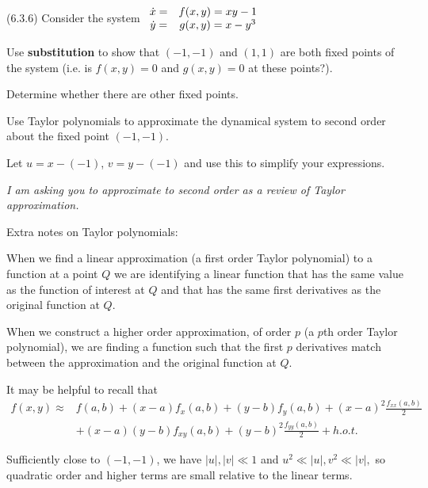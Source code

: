 \documentclass[12pt,letterpaper,noanswers]{exam}
\begin{document}
\begin{questions}
\setcounter{question}{1}
\item (6.3.6) Consider the system
$\displaystyle\begin{array}{c c c}
 \dot{x} = & f(x,y) = x y - 1 \\
 \dot{y} = & g(x,y) = x - y^3
\end{array}$
 \begin{parts}
 \item Use \textbf{substitution} to show that $(-1,-1)$ and $(1,1)$ are both fixed points of the system (i.e. is $f(x,y) = 0$ and $g(x,y) = 0$ at these points?).  
 
 Determine whether there are other fixed points.
 \item Use Taylor polynomials to approximate the dynamical system to second order about the fixed point $(-1, -1)$.  
 
 Let $u = x-(-1)$, $v = y - (-1)$ and use this to simplify your expressions.
 
 \emph{I am asking you to approximate to second order as a review of Taylor approximation.}
 
 \begin{tcolorbox}
 
 Extra notes on Taylor polynomials:
 
 When we find a linear approximation (a first order Taylor polynomial) to a function at a point $Q$ we are identifying a linear function that has the same value as the function of interest at $Q$ and that has the same first derivatives as the original function at $Q$.
 
 When we construct a higher order approximation, of order $p$  (a $p$th order Taylor polynomial), we are finding a function such that the first $p$ derivatives match between the approximation and the original function at $Q$.
 
It may be helpful to recall that
 \begin{align*} 
 f(x,y) \approx& f(a,b) + (x-a)f_x(a,b) + (y-b) f_y(a,b) + (x-a)^2\frac{f_{xx}(a,b)}{2}\\
 &+(x-a)(y-b)f_{xy}(a,b) + (y-b)^2\frac{f_{yy}(a,b)}{2} + h.o.t.
 \end{align*}

\end{tcolorbox}
\item Sufficiently close to $(-1,-1)$, we have $\vert u \vert, \vert v\vert \ll 1$ and $u^2 \ll \vert u \vert, v^2 \ll \vert v \vert,$ so quadratic order and higher terms are small relative to the linear terms.  


\end{parts}
\end{questions}
\end{document}
